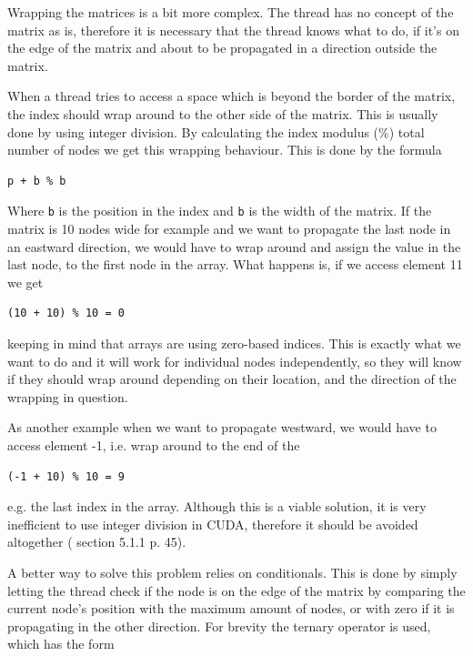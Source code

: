 Wrapping the matrices is a bit more complex. The thread has no concept of the matrix as is, therefore it is necessary that the thread knows what to do, if it's on the edge of the matrix and about to be propagated in a direction outside the matrix.

When a thread tries to access a space which is beyond the border of the matrix, the index should wrap around to the other side of the matrix. This is usually done by using integer division. By calculating the index modulus (\%) total number of nodes we get this wrapping behaviour. This is done by the formula

\begin{verbatim}
p + b % b
\end{verbatim}

Where \texttt{b} is the position in the index and \texttt{b} is the width of the matrix. If the matrix is 10 nodes wide for example and we want to propagate the last node in an eastward direction, we would have to wrap around and assign the value in the last node, to the first node in the array. What happens is, if we access element 11 we get

\begin{verbatim}
(10 + 10) % 10 = 0
\end{verbatim}

keeping in mind that arrays are using zero-based indices. This is exactly what we want to do and it will work for individual nodes independently, so they will know if they should wrap around depending on their location, and the direction of the wrapping in question. 

As another example when we want to propagate westward, we would have to access element -1, i.e. wrap around to the end of the 

\begin{verbatim}
(-1 + 10) % 10 = 9
\end{verbatim}

e.g. the last index in the array. Although this is a viable solution, it is very inefficient to use integer division in CUDA, therefore it should be avoided altogether (\cite{bestpracticesguide} section 5.1.1 p. 45).

A better way to solve this problem relies on conditionals. This is done by simply letting the thread check if the node is on the edge of the matrix by comparing the current node's position with the maximum amount of nodes, or with zero if it is propagating in the other direction. For brevity the ternary operator is used, which has the form

